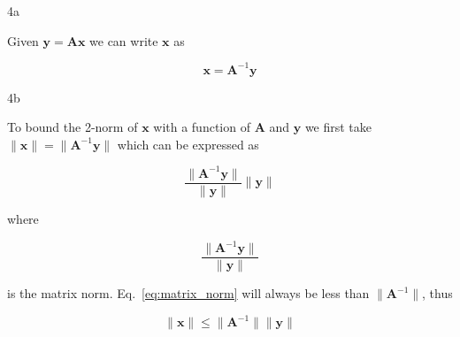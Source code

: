 \documentclass{article}
\begin{document}
\begin{homeworkProblem}

    \begin{homeworkSection}{4a}

        Given $\bm{y} = \bm{Ax}$ we can write $\bm{x}$ as
        
        \begin{equation}
            \bm{x = A}^{-1}\bm{y}
        \end{equation}

    \end{homeworkSection}

    \begin{homeworkSection}{4b}

        To bound the 2-norm of $\bm{x}$ with a function of $\bm{A}$ and $\bm{y}$
        we first take $\|\bm{x}\| = \|\bm{A}^{-1}\bm{y}\|$ which can be
        expressed as

        \begin{equation}
            \frac{\|\bm{A}^{-1}\bm{y}\|}{\|\bm{y}\|}\|\bm{y}\|
        \end{equation}
        
        \noindent where

        \begin{equation}\label{eq:matrix_norm}
            \frac{\|\bm{A}^{-1}\bm{y}\|}{\|\bm{y}\|}
        \end{equation}

        \noindent is the matrix norm. Eq.~\ref{eq:matrix_norm} will always be
        less than $\|\bm{A}^{-1}\|$, thus
        
        \begin{equation}
            \|\bm{x}\| \leq \|\bm{A}^{-1}\|\|\bm{y}\|
        \end{equation}


    \end{homeworkSection}

\end{homeworkProblem}
\end{document}
